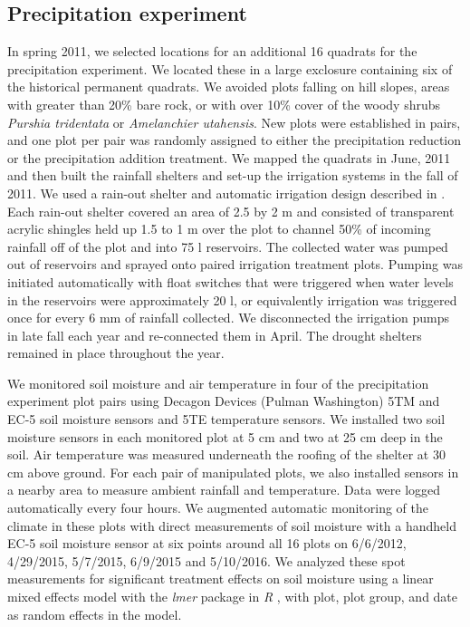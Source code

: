 \documentclass[11pt]{article}
\begin{document}
\begin{doublespacing}
\subsection*{Precipitation experiment}
In spring 2011, we selected locations for an additional 16 quadrats for the precipitation experiment. We located these in a large exclosure containing six of the historical permanent quadrats.  We avoided plots falling on hill slopes, areas with greater than 20\% bare rock, or with over 10\% cover of the woody shrubs \textit{Purshia tridentata} or \textit{Amelanchier utahensis}. New plots were established in pairs, and one plot per pair was randomly assigned to either the precipitation reduction or the precipitation addition treatment. We mapped the quadrats in June, 2011 and then built the rainfall shelters and set-up the irrigation systems in the fall of 2011. We used a rain-out shelter and automatic irrigation design described in \citep{gherardi_automated_2013}. Each rain-out shelter covered an area of 2.5 by 2 m and consisted of transparent acrylic shingles held up 1.5 to 1 m over the plot to channel 50\% of incoming rainfall off of the plot and into 75 l reservoirs. The collected water was pumped out of reservoirs and sprayed onto paired irrigation treatment plots. Pumping was initiated automatically with float switches that were triggered when water levels in the reservoirs were approximately 20 l, or equivalently irrigation was triggered once for every 6 mm of rainfall collected. We disconnected the irrigation pumps in late fall each year and re-connected them in April.  The drought shelters remained in place throughout the year.  

We monitored soil moisture and air temperature in four of the precipitation experiment plot pairs using Decagon Devices (Pulman Washington) 5TM and EC-5 soil moisture sensors and 5TE temperature sensors.  We installed two soil moisture sensors in each monitored plot at 5 cm and two at 25 cm deep in the soil.  Air temperature was measured underneath the roofing of the shelter at 30 cm above ground. For each pair of manipulated plots, we also installed sensors in a nearby area to measure ambient rainfall and temperature. Data were logged automatically every four hours. We augmented automatic monitoring of the climate in these plots with direct measurements of soil moisture with a handheld EC-5 soil moisture sensor at six points around all 16 plots on 6/6/2012, 4/29/2015, 5/7/2015, 6/9/2015 and 5/10/2016. We analyzed these spot measurements for significant treatment effects on soil moisture using a linear mixed effects model with the \textit{lmer} package in \textit{R} \citep{bates}, with plot, plot group, and date as random effects in the model.    


\end{doublespacing}
\end{document}
